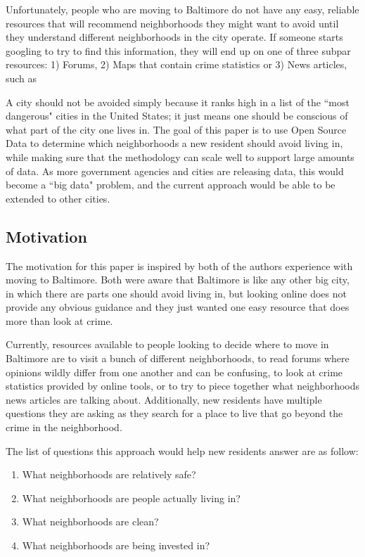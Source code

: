 \documentclass[conference]{IEEEtran}
\begin{document}
Unfortunately, people who are moving to Baltimore do not have any easy, reliable resources that will recommend neighborhoods they might want
to avoid until they understand different neighborhoods in the city operate.  If someone starts googling to try to find this information, they will
end up on one of three subpar resources: 1) Forums, 2) Maps that contain crime statistics or 3) News articles, such as


A city should not be avoided simply because it ranks high in a list of the ``most dangerous" cities in the United States;
it just means one should be conscious of what part of the city one lives in.  The goal of this paper is to use Open Source Data to determine
which neighborhoods a new resident should avoid living in, while making sure that the methodology can scale well to support large amounts
of data.  As more government agencies and cities are releasing data, this would become a ``big data" problem,
and the current approach would be able to be extended to other cities.


\subsection{Motivation}
The motivation for this paper is inspired by both of the authors experience with moving to Baltimore.  Both were aware that
Baltimore is like any other big city, in which there are parts one should avoid living in, but looking online
does not provide any obvious guidance and they just wanted one easy resource that does more than look at crime.

Currently, resources available to people looking to decide where to move
in Baltimore are to visit a bunch of different neighborhoods, to read forums where opinions wildly differ from one another and can be confusing, to look at
crime statistics provided by online tools, or to try to piece together what neighborhoods news articles are talking about.
Additionally, new residents have multiple questions they are asking as they search for a place to live that go beyond
the crime in the neighborhood.

The list of questions this approach would help new residents answer are as follow:
\begin{enumerate}
	\item What neighborhoods are relatively safe?
	\item What neighborhoods are people actually living in?
	\item What neighborhoods are clean?
	\item What neighborhoods are being invested in?
\end{enumerate}
\end{document}
